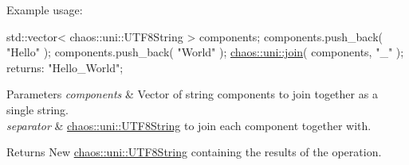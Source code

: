 Example usage\+:


\begin{DoxyCode}
std::vector< chaos::uni::UTF8String > components;
components.push\_back( \textcolor{stringliteral}{"Hello"} );
components.push\_back( \textcolor{stringliteral}{"World"} );
\hyperlink{namespacechaos_1_1uni_ad2a77983423c8b10e2b18cae6f35d329}{chaos::uni::join}( components, \textcolor{stringliteral}{"\_"} ); returns: \textcolor{stringliteral}{"Hello\_World"};
\end{DoxyCode}



\begin{DoxyParams}{Parameters}
{\em components} & Vector of string components to join together as a single string. \\
\hline
{\em separator} & \hyperlink{classchaos_1_1uni_1_1_u_t_f8_string}{chaos\+::uni\+::\+U\+T\+F8\+String} to join each component together with. \\
\hline
\end{DoxyParams}
\begin{DoxyReturn}{Returns}
New \hyperlink{classchaos_1_1uni_1_1_u_t_f8_string}{chaos\+::uni\+::\+U\+T\+F8\+String} containing the results of the operation. 
\end{DoxyReturn}
